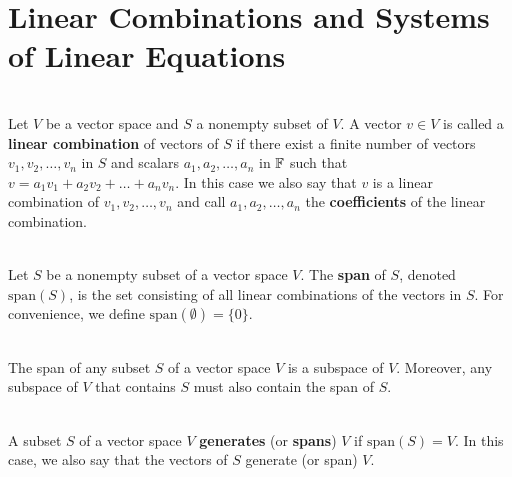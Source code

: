 \section{Linear Combinations and Systems of Linear Equations}

\begin{definition}
	\hfill\\
	Let $V$ be a vector space and $S$ a nonempty subset of $V$. A vector $v \in V$ is called a \textbf{linear combination} of vectors of $S$ if there exist a finite number of vectors $v_1, v_2, \dots, v_n$ in $S$ and scalars $a_1, a_2, \dots, a_n$ in $\mathbb{F}$ such that $v=a_1v_1 + a_2v_2 + \dots + a_nv_n$. In this case we also say that $v$ is a linear combination of $v_1, v_2, \dots, v_n$ and call $a_1, a_2, \dots, a_n$ the \textbf{coefficients} of the linear combination.
\end{definition}

\begin{definition}
	\hfill\\
	Let $S$ be a nonempty subset of a vector space $V$. The \textbf{span} of $S$, denoted $\text{span}(S)$, is the set consisting of all linear combinations of the vectors in $S$. For convenience, we define $\text{span}(\emptyset) = \{0\}$.
\end{definition}

\begin{theorem}
	\hfill\\
	The span of any subset $S$ of a vector space $V$ is a subspace of $V$. Moreover, any subspace of $V$ that contains $S$ must also contain the span of $S$.
\end{theorem}

\begin{definition}
	\hfill\\
	A subset $S$ of a vector space $V$ \textbf{generates} (or \textbf{spans}) $V$ if $\text{span}(S) = V$. In this case, we also say that the vectors of $S$ generate (or span) $V$.
\end{definition}